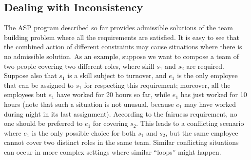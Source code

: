 \documentclass{tlp}
\begin{document}
\subsection{Dealing with Inconsistency}

The ASP program described so far provides admissible solutions of the team building problem
where all the requirements are satisfied.
It is easy to see that the combined action of different constraints
may cause situations where there is no admissible solution.
As an example, suppose we want to compose a team of two people covering two different roles,
where skill $s_{1}$ and $s_{2}$ are required. Suppose also that $s_{1}$ is a skill subject to turnover,
and $e_{1}$ is the only employee that can be assigned to $s_{1}$ for respecting this requirement;
moreover, all the employees but $e_{1}$ have worked for 20 hours so far,
while $e_{1}$ has just worked for 10 hours (note that such a situation is not unusual,
because $e_{1}$ may have worked during night in its last assignment).
According to the fairness requirement, no one should be preferred to $e_{1}$ for covering $s_{2}$.
This leads to a conflicting scenario where $e_{1}$ is the only possible choice for both $s_{1}$ and $s_{2}$,
but the same employee cannot cover two distinct roles in the same team.
Similar conflicting situations can occur in more complex settings where similar ``loops'' might happen.
\end{document}
